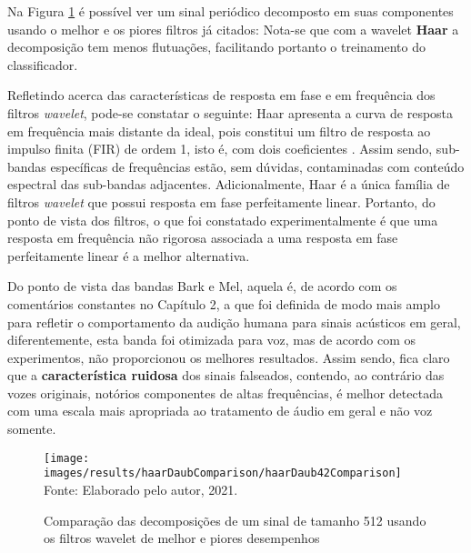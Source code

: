 	\par Na Figura \ref{fig:haardaub42comparison} é possível ver um sinal periódico decomposto em suas componentes usando o melhor e os piores filtros já citados: Nota-se que com a wavelet \textbf{Haar} a decomposição tem menos flutuações, facilitando portanto o treinamento do classificador.\\
		
	\par Refletindo acerca das características de resposta em fase e em frequência dos filtros \textit{wavelet}, pode-se constatar o seguinte: Haar apresenta a curva de resposta em frequência mais distante da ideal, pois constitui um filtro de resposta ao impulso finita (FIR) de ordem 1, isto é, com dois coeficientes \cite{WaveletPropertiesBrowser}. Assim sendo, sub-bandas específicas de frequências estão, sem dúvidas, contaminadas com conteúdo espectral das sub-bandas adjacentes. Adicionalmente, Haar é a única família de filtros \textit{wavelet} que possui resposta em fase perfeitamente linear. Portanto, do ponto de vista dos filtros, o que foi constatado experimentalmente é que uma resposta em frequência não rigorosa associada a uma resposta em fase perfeitamente linear é a melhor alternativa.\\
	
	\par Do ponto de vista das bandas Bark e Mel, aquela é, de acordo com os comentários constantes no Capítulo 2, a que foi definida de modo mais amplo para refletir o comportamento da audição humana para sinais acústicos em geral, diferentemente, esta banda foi otimizada para voz, mas de acordo com os experimentos, não proporcionou os melhores resultados. Assim sendo, fica claro que a \textbf{característica ruidosa} dos sinais falseados, contendo, ao contrário das vozes originais, notórios componentes de altas frequências, é melhor detectada com uma escala mais apropriada ao tratamento de áudio em geral e não voz somente.\\
	
	\begin{figure}[h]
		\centering
		\caption{Comparação das decomposições de um sinal de tamanho 512 usando os filtros wavelet de melhor e piores desempenhos }
		\texttt{[image: images/results/haarDaubComparison/haarDaub42Comparison]}
		\label{fig:haardaub42comparison}
		\\Fonte: Elaborado pelo autor, 2021.
	\end{figure}
	
